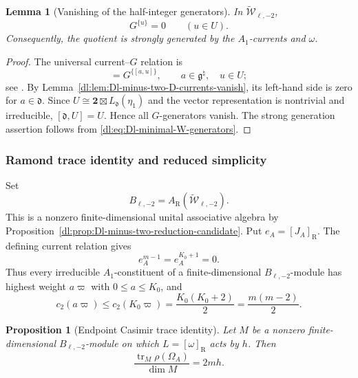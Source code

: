\documentclass[11pt,reqno]{amsart}
\newtheorem{lemma}[theorem]{Lemma}
\newtheorem{proposition}[theorem]{Proposition}
\theoremstyle{definition}
\theoremstyle{remark}
\begin{document}
\begin{lemma}[Vanishing of the half-integer generators]
\label{dl:lem:Dl-minus-two-G-fields-vanish}
In \(\widetilde{\mathcal W}_{\ell,-2}\),
\begin{equation*}
  G^{\{u\}}=0
  \qquad
  (u\in U).
\end{equation*}
Consequently, the quotient is strongly generated by the
\(A_1\)-currents and \(\omega\).
\end{lemma}

\begin{proof}
The universal current--\(G\) relation is
\begin{equation*}
  [J^{\{a\}}{}_{\lambda}G^{\{u\}}]
  =
  G^{\{[a,u]\}},
  \qquad
  a\in\mathfrak g^\natural,
  \quad u\in U;
\end{equation*}
see \cite{AdamovicKacMosenederFrajriaPapiPerse2018}.
By Lemma~\ref{dl:lem:Dl-minus-two-D-currents-vanish}, its left-hand side
is zero for \(a\in\mathfrak d\).  Since
\(U\cong\mathbf2\boxtimes L_{\mathfrak d}(\eta_1)\) and the vector
representation is nontrivial and irreducible,
\([\mathfrak d,U]=U\).  Hence all \(G\)-generators vanish.  The strong
generation assertion follows from
\eqref{dl:eq:Dl-minimal-W-generators}.
\end{proof}

\subsubsection{Ramond trace identity and reduced simplicity}


Set
\begin{equation*}
  B_{\ell,-2}
  =
  A_{\mathrm R}(\widetilde{\mathcal W}_{\ell,-2}).
\end{equation*}
This is a nonzero finite-dimensional unital associative algebra by
Proposition~\ref{dl:prop:Dl-minus-two-reduction-candidate}.  Put
\(e_A=[J_A]_{\mathrm R}\).  The defining current relation gives
\begin{equation*}
  e_A^{m-1}=e_A^{K_0+1}=0.
\end{equation*}
Thus every irreducible \(A_1\)-constituent of a finite-dimensional
\(B_{\ell,-2}\)-module has highest weight \(a\varpi\) with
\(0\le a\le K_0\), and
\begin{equation}
  c_2(a\varpi)
  \le
  c_2(K_0\varpi)
  =
  \frac{K_0(K_0+2)}2
  =
  \frac{m(m-2)}2.
  \label{dl:eq:Dl-minus-two-A-Casimir-bound}
\end{equation}

\begin{proposition}[Endpoint Casimir trace identity]
\label{dl:prop:Dl-minus-two-Casimir-trace}
Let \(M\) be a nonzero finite-dimensional
\(B_{\ell,-2}\)-module on which
\(L=[\omega]_{\mathrm R}\) acts by \(h\).  Then
\begin{equation*}
  \frac{\operatorname{tr}_M\rho(\Omega_A)}{\dim M}
  =
  2mh.
\end{equation*}
\end{proposition}
\end{document}
